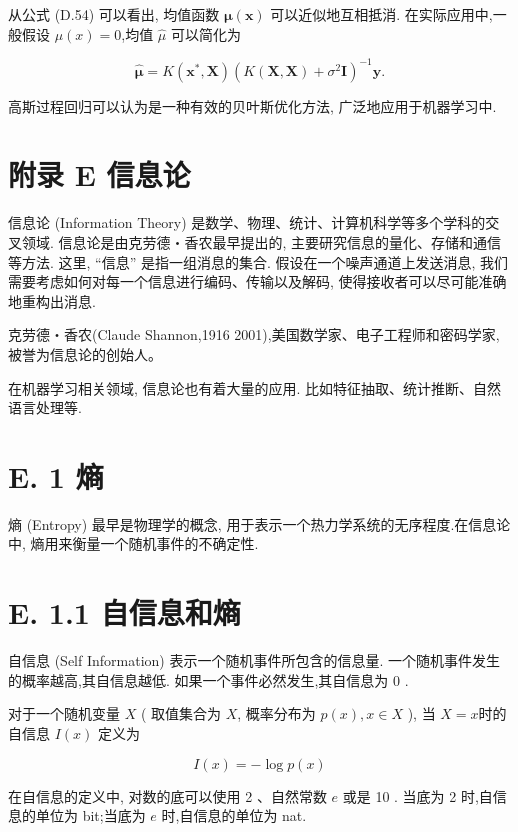 \documentclass[10pt]{article}
\begin{document}
从公式 (D.54) 可以看出, 均值函数 $\boldsymbol{\mu}(\boldsymbol{x})$ 可以近似地互相抵消. 在实际应用中,一般假设 $\mu(x)=0$,均值 $\hat{\mu}$ 可以简化为


\begin{equation*}
\hat{\boldsymbol{\mu}}=K\left(\boldsymbol{x}^{*}, \boldsymbol{X}\right)\left(K(\boldsymbol{X}, \boldsymbol{X})+\sigma^{2} \boldsymbol{I}\right)^{-1} \boldsymbol{y} . \tag{D.56}
\end{equation*}


高斯过程回归可以认为是一种有效的贝叶斯优化方法, 广泛地应用于机器学习中.

\section*{附录 E 信息论}
信息论 (Information Theory) 是数学、物理、统计、计算机科学等多个学科的交叉领域. 信息论是由克劳德・香农最早提出的, 主要研究信息的量化、存储和通信等方法. 这里, “信息” 是指一组消息的集合. 假设在一个噪声通道上发送消息, 我们需要考虑如何对每一个信息进行编码、传输以及解码, 使得接收者可以尽可能准确地重构出消息.

克劳德・香农(Claude Shannon,1916 2001),美国数学家、电子工程师和密码学家, 被誉为信息论的创始人。

在机器学习相关领域, 信息论也有着大量的应用. 比如特征抽取、统计推断、自然语言处理等.

\section*{E. 1 熵}
熵 (Entropy) 最早是物理学的概念, 用于表示一个热力学系统的无序程度.在信息论中, 熵用来衡量一个随机事件的不确定性.

\section*{E. 1.1 自信息和熵}
自信息 (Self Information) 表示一个随机事件所包含的信息量. 一个随机事件发生的概率越高,其自信息越低. 如果一个事件必然发生,其自信息为 0 .

对于一个随机变量 $X$ ( 取值集合为 $X$, 概率分布为 $p(x), x \in X$ ), 当 $X=x$时的自信息 $I(x)$ 定义为


\begin{equation*}
I(x)=-\log p(x) \tag{E.1}
\end{equation*}


在自信息的定义中, 对数的底可以使用 2 、自然常数 $e$ 或是 10 . 当底为 2 时,自信息的单位为 bit;当底为 $e$ 时,自信息的单位为 nat.
\end{document}
